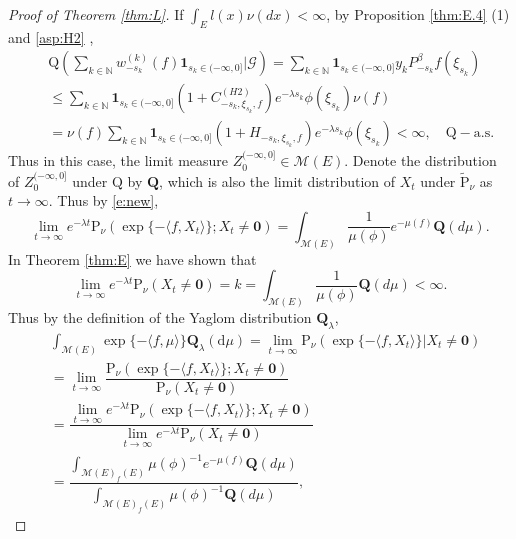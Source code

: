 \documentclass[12pt,a4paper]{amsart}
\numberwithin{equation}{section}
\theoremstyle{plain}
\theoremstyle{definition}
\theoremstyle{remark}
\begin{document}
\begin{proof}[Proof of Theorem \ref{thm:L}]
If  $\int_E l(x) \nu(dx)<\infty$,
 by Proposition \ref{thm:E.4} (1) and \eqref{asp:H2} ,
\begin{eqnarray*}
&&\mathrm Q\left( \sum_{k\in\mathbb N}w^{(k)}_{-s_k}(f)\mathbf 1_{s_k\in (-\infty, 0]}\Big|\mathcal G\right)=\sum_{k\in\mathbb N}\mathbf 1_{s_k\in (-\infty, 0]}y_kP^{\beta}_{-s_k}f( \xi_{s_k})\\
&&\leq\sum_{k\in\mathbb N}\mathbf 1_{s_k\in (-\infty, 0]}(1+C^{(H2)}_{-s_k, \xi_{s_k}, f})
e^{-\lambda s_k}\phi(\xi_{s_k})\nu(f)\\
&&=\nu(f)\sum_{k\in\mathbb N}\mathbf 1_{s_k\in (-\infty, 0]}(1+H_{-s_k, \xi_{s_k}, f})
e^{-\lambda s_k}\phi(\xi_{s_k})<\infty, \quad \mathrm Q-\text{a.s.}
\end{eqnarray*}
 Thus in this case, the limit measure
$Z_0^{(-\infty, 0]}\in \mathcal M(E)$.
 Denote the distribution of $Z_0^{(-\infty, 0]}$ under
  ${\mathrm Q}$ by $\mathbf Q$,
  which is also the limit distribution of $X_t$ under $\widetilde{\mathrm P}_\nu$ as $t\to\infty$.  
 Thus by \eqref{e:new},
\[
\lim_{t\rightarrow\infty}e^{-\lambda t}\mathrm P_\nu\left(\exp\{-\langle f, X_t\rangle \};
X_t\neq \mathbf 0\right)=
\int_{{\mathcal M(E)}}\frac{1}{\mu(\phi)}e^{-\mu(f)}\mathbf Q(d\mu).
\]
In Theorem \ref{thm:E} we have shown that
\[
\lim_{t\rightarrow\infty}e^{-\lambda t}\mathrm P_\nu(X_t\neq \mathbf 0)=k
=\int_{{\mathcal M(E)}}\frac{1}{\mu(\phi)}\mathbf Q(d\mu)<\infty.
\]
Thus by the definition of the Yaglom distribution ${\mathbf Q}_\lambda $,
\begin{align*}
&\int_{\mathcal M(E)}\exp\{-\langle f, \mu\rangle \}\mathbf Q_\lambda(\mathrm d\mu)
=\lim_{t\rightarrow\infty}\mathrm P_\nu\left(\exp\{-\langle f, X_t\rangle \}\Big|X_t\neq \mathbf 0\right)\\
&=\lim_{t\rightarrow\infty}\dfrac{\mathrm P_\nu\left(\exp\{-\langle f, X_t\rangle \};X_t\neq \mathbf 0\right)}{\mathrm P_\nu(X_t\neq \mathbf 0)}\\
&=\dfrac{\lim_{t\rightarrow\infty}e^{-\lambda t}\mathrm P_\nu\left(\exp\{-\langle f, X_t\rangle \};X_t\neq \mathbf 0\right)}{\lim_{t\rightarrow\infty}e^{-\lambda t}\mathrm P_\nu(X_t\neq \mathbf 0)}\\
&=\dfrac{\int_{{\mathcal M(E)}_f(E)}\mu(\phi)^{-1}e^{-\mu(f)}\mathbf Q(d\mu)}{\int_{{\mathcal M(E)}_f(E)}\mu(\phi)^{-1}\mathbf Q(d\mu)},
\end{align*}

\end{proof}
\end{document}
